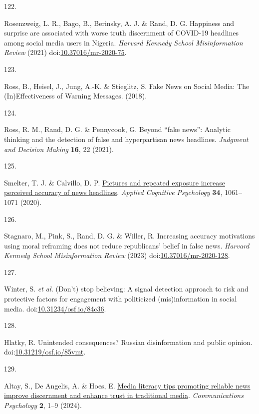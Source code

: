 \documentclass[
  man]{apa6}
\newlength{\cslhangindent}
\newlength{\csllabelwidth}
\newenvironment{CSLReferences}[2] %
 {\begin{list}{}{%
  \setlength{\itemindent}{0pt}
  \setlength{\leftmargin}{0pt}
  \setlength{\parsep}{0pt}
  \ifodd #1
   \setlength{\leftmargin}{\cslhangindent}
   \setlength{\itemindent}{-1\cslhangindent}
  \fi
  \setlength{\itemsep}{#2\baselineskip}}}
 {\end{list}}
\newcommand{\CSLLeftMargin}[1]{\parbox[t]{\csllabelwidth}{\strut#1\strut}}
\newcommand{\CSLRightInline}[1]{\parbox[t]{\linewidth - \csllabelwidth}{\strut#1\strut}}
\begin{document}
\begin{CSLReferences}{0}{0}
\CSLLeftMargin{122. }%
\CSLRightInline{*Rosenzweig, L. R., Bago, B., Berinsky, A. J. \& Rand, D. G. Happiness and surprise are associated with worse truth discernment of COVID-19 headlines among social media users in Nigeria. \emph{Harvard Kennedy School Misinformation Review} (2021) doi:\href{https://doi.org/10.37016/mr-2020-75}{10.37016/mr-2020-75}.}

\CSLLeftMargin{123. }%
\CSLRightInline{*Ross, B., Heisel, J., Jung, A.-K. \& Stieglitz, S. Fake News on Social Media: The (In)Effectiveness of Warning Messages. (2018).}

\CSLLeftMargin{124. }%
\CSLRightInline{*Ross, R. M., Rand, D. G. \& Pennycook, G. Beyond {``}fake news{''}: Analytic thinking and the detection of false and hyperpartisan news headlines. \emph{Judgment and Decision Making} \textbf{16}, 22 (2021).}

\CSLLeftMargin{125. }%
\CSLRightInline{*Smelter, T. J. \& Calvillo, D. P. \href{https://doi.org/10.1002/acp.3684}{Pictures and repeated exposure increase perceived accuracy of news headlines}. \emph{Applied Cognitive Psychology} \textbf{34}, 1061--1071 (2020).}

\CSLLeftMargin{126. }%
\CSLRightInline{*Stagnaro, M., Pink, S., Rand, D. G. \& Willer, R. Increasing accuracy motivations using moral reframing does not reduce republicans{'} belief in false news. \emph{Harvard Kennedy School Misinformation Review} (2023) doi:\href{https://doi.org/10.37016/mr-2020-128}{10.37016/mr-2020-128}.}

\CSLLeftMargin{127. }%
\CSLRightInline{*Winter, S. \emph{et al.} (Don{'}t) stop believing: A signal detection approach to risk and protective factors for engagement with politicized (mis)information in social media. doi:\href{https://doi.org/10.31234/osf.io/84c36}{10.31234/osf.io/84c36}.}

\CSLLeftMargin{128. }%
\CSLRightInline{*Hlatky, R. Unintended consequences? Russian disinformation and public opinion. doi:\href{https://doi.org/10.31219/osf.io/85vmt}{10.31219/osf.io/85vmt}.}

\CSLLeftMargin{129. }%
\CSLRightInline{*Altay, S., De Angelis, A. \& Hoes, E. \href{https://doi.org/10.1038/s44271-024-00121-5}{Media literacy tips promoting reliable news improve discernment and enhance trust in traditional media}. \emph{Communications Psychology} \textbf{2}, 1--9 (2024).}


\end{CSLReferences}
\end{document}
